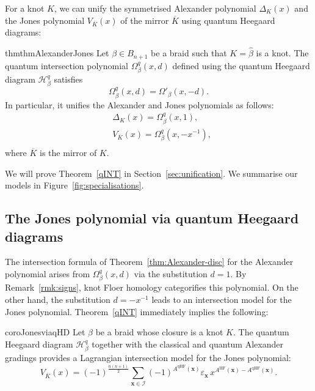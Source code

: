 \documentclass[11pt]{amsart}
\numberwithin{equation}{section}
\numberwithin{figure}{section}
\theoremstyle{definition}
\newcommand{\cI}{\mathcal{I}}
\newcommand{\mK}{\overline{K}}
\DeclareMathOperator{\qHF}{qHF}
\DeclareMathOperator{\HF}{HF}
\newcommand{\xs}{\boldsymbol{x}}
\begin{document}
For a knot $K$, we can unify the symmetrised Alexander polynomial $\Delta_K(x)$ and the Jones polynomial $V_{\mK}(x)$ of the mirror $\mK$ using quantum Heegaard diagrams:

\begin{restatable}{thm}{thmAlexanderJones}\label{qINT} 
Let $\beta \in B_{n+1}$ be a braid such that $K=\hat{\beta}$ is a knot. The quantum intersection polynomial $\Omega^q_\beta(x,d)$ defined using the quantum Heegaard diagram $\mathscr H^q_{\beta}$ satisfies
\[
\Omega^q_\beta(x,d) = \Omega'_\beta(x,-d).
\]
In particular, it unifies the Alexander and Jones polynomials as follows: 
\begin{equation}
\begin{aligned}
&\Delta_K(x) = \Omega^q_\beta(x,1),\\
&V_{\mK}(x) = \Omega^q_\beta(x,-x^{-1}),\\
\end{aligned}
\end{equation}
where $\mK$ is the mirror of $K$.
\end{restatable}

We will prove Theorem~\ref{qINT} in Section~\ref{sec:unification}. We summarise our models in Figure~\ref{fig:specialisations}.

\subsection{The Jones polynomial via quantum Heegaard diagrams} 
The intersection formula of Theorem~\ref{thm:Alexander-disc} for the Alexander polynomial arises from $\Omega^q_\beta(x,d)$ via the substitution $d=1$. By Remark~\ref{rmk:signs}, knot Floer homology categorifies this polynomial. On the other hand, the substitution $d=-x^{-1}$ leads to an intersection model for the Jones polynomial. Theorem~\ref{qINT} immediately implies the following:

\begin{restatable}{coro}{JonesviaqHD}
\label{TintJ}
Let $\beta$ be a braid whose closure is a knot $K$. The quantum Heegaard diagram $\mathscr H^q_{\beta}$ together with the classical and quantum Alexander gradings provides a Lagrangian intersection model for the Jones polynomial:
\begin{equation}
V_{\mK}(x)= (-1)^{\frac{n(n+1)}{2}} \sum_{\xs\in \cI} (-1)^{A^{\qHF}(\xs)} \varepsilon_{\xs} \, x^{A^{\HF}(\xs)-A^{\qHF}(\xs)}.
\end{equation}
\end{restatable}
\end{document}
